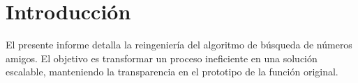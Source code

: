 \section{Introducción}
El presente informe detalla la reingeniería del algoritmo de búsqueda de números amigos. El objetivo es transformar un proceso ineficiente en una solución escalable, manteniendo la transparencia en el prototipo de la función original.
